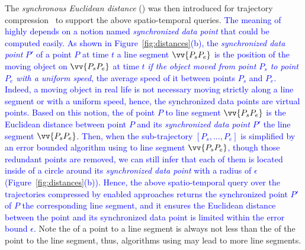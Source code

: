 The \emph{synchronous Euclidean distance} (\sed) was then introduced for trajectory compression~\cite{Meratnia:Spatiotemporal,Potamias:Sampling,Muckell:Compression,Chen:Fast} to support the above spatio-temporal queries.
\textcolor{blue}{The meaning of \sed highly depends on a notion named \emph{synchronized data point} \cite{Meratnia:Spatiotemporal} that could be computed easily. As shown in Figure~\ref{fig:distances}(b), the \emph{synchronized data point} $P'$ of a point $P$ at time $t$ \wrt a line segment $\vv{P_sP_e}$  is the position of the moving object on $\vv{P_sP_e}$ at time $t$ \emph{if the object moved from point $P_s$ to point $P_e$ with a uniform speed}, \ie the average speed of it between points $P_s$ and $P_e$.}
\textcolor{blue}{Indeed, a moving object in real life is not necessary moving strictly along a line segment or with a uniform speed, hence, the synchronized data points are virtual points.}
\textcolor{blue}{Based on this notion, the \sed of point $P$ to line segment $\vv{P_sP_e}$ is the Euclidean distance between point $P$ and its \emph{synchronized data point} $P'$  \wrt the line segment $\vv{P_sP_e}$.}
\textcolor{blue}{Then, when the sub-trajectory $[P_s, ..., P_e]$ is simplified by an error bounded \lsa algorithm using \sed to line segment $\vv{P_sP_e}$, though those redundant points are removed, we can still infer that each of them is located inside of a circle around its \emph{synchronized data point} with a radius of $\epsilon$ (Figure~\ref{fig:distances}(b)).}
\textcolor{blue}{Hence, the above spatio-temporal query over the trajectories compressed by \sed enabled approaches returns the synchronized point $P'$ of $P$ \wrt the corresponding line segment, and it ensures the Euclidean distance between the point and its synchronized data point is limited within the error bound $\epsilon$.}
%
Note the \sed of a point to a line segment is always not less than the \ped of the point to the line segment, thus, \lsa algorithms using \sed may lead to more line segments.


